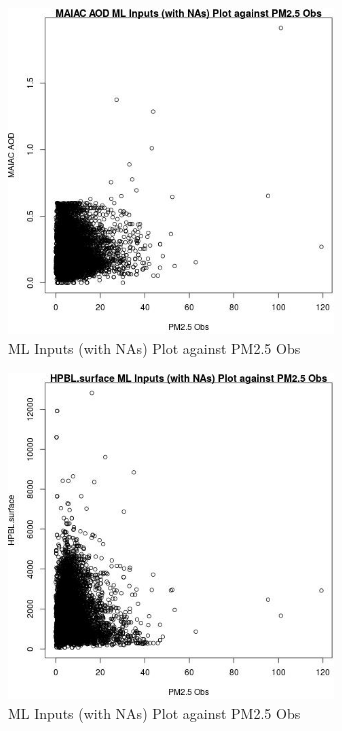 \begin{figure} 
\centering  
\includegraphics[width=0.77\textwidth]{Code_Outputs/Report_ML_input_PM25_Step4_part_e_de_duplicated_aves_compiled_2019-05-18wNAs_MAIAC_AODvPM25_Obs.jpg} 
\caption{\label{fig:Report_ML_input_PM25_Step4_part_e_de_duplicated_aves_compiled_2019-05-18wNAsMAIAC_AODvPM25_Obs}ML Inputs (with NAs) Plot against PM2.5 Obs} 
\end{figure} 
 

\begin{figure} 
\centering  
\includegraphics[width=0.77\textwidth]{Code_Outputs/Report_ML_input_PM25_Step4_part_e_de_duplicated_aves_compiled_2019-05-18wNAs_HPBLsurfacevPM25_Obs.jpg} 
\caption{\label{fig:Report_ML_input_PM25_Step4_part_e_de_duplicated_aves_compiled_2019-05-18wNAsHPBLsurfacevPM25_Obs}ML Inputs (with NAs) Plot against PM2.5 Obs} 
\end{figure} 
 

